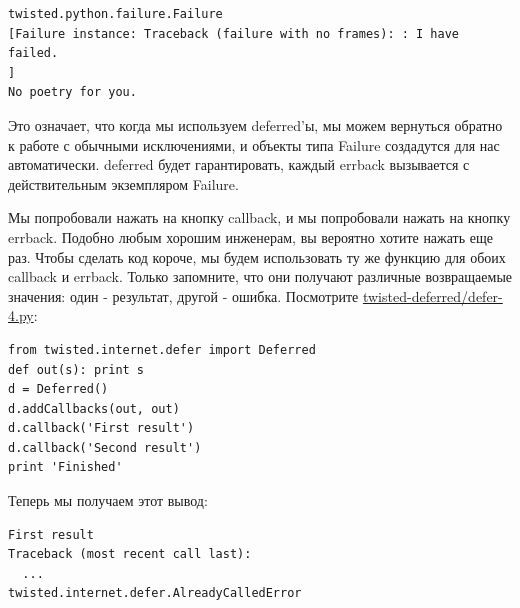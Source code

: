 \begin{scriptsize}\begin{verbatim}
twisted.python.failure.Failure
[Failure instance: Traceback (failure with no frames): : I have failed.
]
No poetry for you.
\end{verbatim}\end{scriptsize}


Это означает, что когда мы используем deferred'ы, мы можем 
вернуться обратно к работе с обычными исключениями, и объекты 
типа Failure создадутся для нас автоматически. deferred будет 
гарантировать, каждый errback вызывается с действительным 
экземпляром Failure.


Мы попробовали нажать на кнопку callback, и 
мы попробовали нажать на кнопку errback. Подобно любым 
хорошим инженерам, вы вероятно хотите нажать еще раз. 
Чтобы сделать код короче, мы будем использовать ту же 
функцию для обоих callback и errback. Только запомните, что 
они получают различные возвращаемые значения: один - результат, 
другой - ошибка. Посмотрите 
\href{http://github.com/jdavisp3/twisted-intro/blob/master/twisted-deferred/defer-4.py}{twisted-deferred/defer-4.py}:

\begin{scriptsize}\begin{verbatim}
from twisted.internet.defer import Deferred
def out(s): print s
d = Deferred()
d.addCallbacks(out, out)
d.callback('First result')
d.callback('Second result')
print 'Finished'
\end{verbatim}\end{scriptsize}

Теперь мы получаем этот вывод:

\begin{scriptsize}\begin{verbatim}
First result
Traceback (most recent call last):
  ...
twisted.internet.defer.AlreadyCalledError
\end{verbatim}\end{scriptsize}


